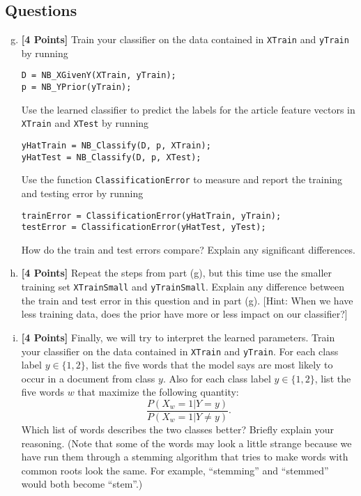 \documentclass{article}
\newcommand \code [1]{{\tt #1}}
\begin{document}
\subsection*{Questions}

\begin{enumerate}[(a)]
  \setcounter{enumi}{6}

\item {\bf [4 Points]} Train your classifier on the data contained in
  \code{XTrain} and \code{yTrain} by running
\begin{verbatim}
D = NB_XGivenY(XTrain, yTrain);
p = NB_YPrior(yTrain);
\end{verbatim}
  Use the learned classifier to predict the labels for the article
  feature vectors in \code{XTrain} and \code{XTest} by running
\begin{verbatim}
yHatTrain = NB_Classify(D, p, XTrain);
yHatTest = NB_Classify(D, p, XTest);
\end{verbatim}
  Use the function \code{ClassificationError} to measure and report
  the training and testing error by running
\begin{verbatim}
trainError = ClassificationError(yHatTrain, yTrain);
testError = ClassificationError(yHatTest, yTest);
\end{verbatim}
  How do the train and test errors compare? Explain any significant
  differences.

\item {\bf [4 Points]} Repeat the steps from part (g), but this time
  use the smaller training set \code{XTrainSmall} and
  \code{yTrainSmall}. Explain any difference between the train and
  test error in this question and in part (g). [Hint: When we have
  less training data, does the prior have more or less impact on our
  classifier?]

\item {\bf [4 Points]} Finally, we will try to interpret the learned
  parameters. Train your classifier on the data contained in
  \code{XTrain} and \code{yTrain}. For each class label
  $y \in \{1, 2\}$, list the five words that the model says are most
  likely to occur in a document from class $y$. Also for each class
  label $y \in \{1, 2\}$, list the five words $w$ that maximize the
  following quantity:
  \[
  \frac{P(X_w = 1 | Y = y)}{P(X_w = 1 | Y \neq y)}.
  \]
  Which list of words describes the two classes better? Briefly
  explain your reasoning. (Note that some of the words may look a
  little strange because we have run them through a stemming algorithm
  that tries to make words with common roots look the same. For
  example, ``stemming'' and ``stemmed'' would both become ``stem''.)
  
\end{enumerate}
\end{document}
